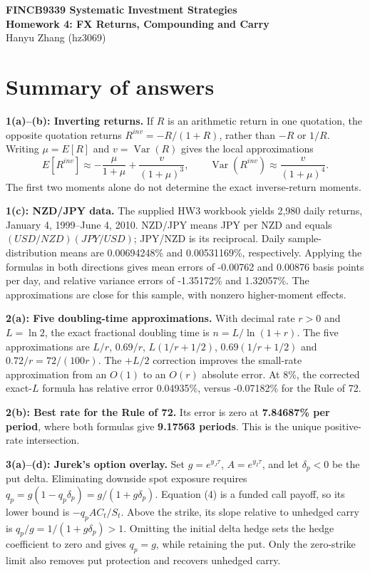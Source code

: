 \documentclass[11pt,letterpaper]{article}
\newcommand{\rNZMean}{0.00694248}
\newcommand{\rJYMean}{0.00531169}
\newcommand{\rNZErr}{-0.00762}
\newcommand{\rJYErr}{0.00876}
\newcommand{\rNZVarErr}{-1.35172}
\newcommand{\rJYVarErr}{1.32057}
\newcommand{\rOptRate}{7.84687}
\newcommand{\rOptPeriods}{9.17563}
\newcommand{\rEightCorrectedError}{0.04935}
\newcommand{\rEightRuleError}{-0.07182}
\begin{document}
\begin{center}{\Large\bfseries FINCB9339 Systematic Investment Strategies\\[3pt]
Homework 4: FX Returns, Compounding and Carry}\\[8pt]
Hanyu Zhang (hz3069)\end{center}
\section*{Summary of answers}
\textbf{1(a)--(b): Inverting returns.} If $R$ is an arithmetic return in one quotation,
the opposite quotation returns $R^{inv}=-R/(1+R)$, rather than $-R$ or $1/R$.
Writing $\mu=E[R]$ and $v=\operatorname{Var}(R)$ gives the local approximations
\[
E[R^{inv}]\approx-\frac{\mu}{1+\mu}+\frac{v}{(1+\mu)^3},\qquad
\operatorname{Var}(R^{inv})\approx\frac{v}{(1+\mu)^4}.
\]
The first two moments alone do not determine the exact inverse-return moments.

\textbf{1(c): NZD/JPY data.} The supplied HW3 workbook yields 2,980 daily returns,
January 4, 1999--June 4, 2010. NZD/JPY means JPY per NZD and equals
$(USD/NZD)(JPY/USD)$; JPY/NZD is its reciprocal. Daily sample-distribution means
are \rNZMean{}\% and \rJYMean{}\%, respectively. Applying the formulas in both
directions gives mean errors of \rNZErr{} and \rJYErr{} basis points per day,
and relative variance errors of \rNZVarErr{}\% and \rJYVarErr{}\%.
The approximations are close for this sample, with nonzero higher-moment effects.

\textbf{2(a): Five doubling-time approximations.} With decimal rate $r>0$ and
$L=\ln2$, the exact fractional doubling time is $n=L/\ln(1+r)$.
The five approximations are $L/r$, $0.69/r$, $L(1/r+1/2)$,
$0.69(1/r+1/2)$ and $0.72/r=72/(100r)$.
The $+L/2$ correction improves the small-rate approximation from an $O(1)$ to an
$O(r)$ absolute error. At 8\%, the corrected exact-$L$ formula has relative error
\rEightCorrectedError{}\%, versus \rEightRuleError{}\% for the Rule of 72.

\textbf{2(b): Best rate for the Rule of 72.} Its error is zero at
\textbf{\rOptRate{}\% per period}, where both formulas give
\textbf{\rOptPeriods{} periods}. This is the unique positive-rate intersection.

\textbf{3(a)--(d): Jurek's option overlay.} Set $g=e^{y_J\tau}$, $A=e^{y_I\tau}$,
and let $\delta_p<0$ be the put delta. Eliminating downside spot exposure requires
$q_p=g(1-q_p\delta_p)=g/(1+g\delta_p)$.
Equation (4) is a funded call payoff, so its lower bound is $-q_pAC_t/S_t$.
Above the strike, its slope relative to unhedged carry is
$q_p/g=1/(1+g\delta_p)>1$. Omitting the initial delta hedge sets the hedge
coefficient to zero and gives $q_p=g$, while retaining the put. Only the
zero-strike limit also removes put protection and recovers unhedged carry.
\clearpage
\end{document}
